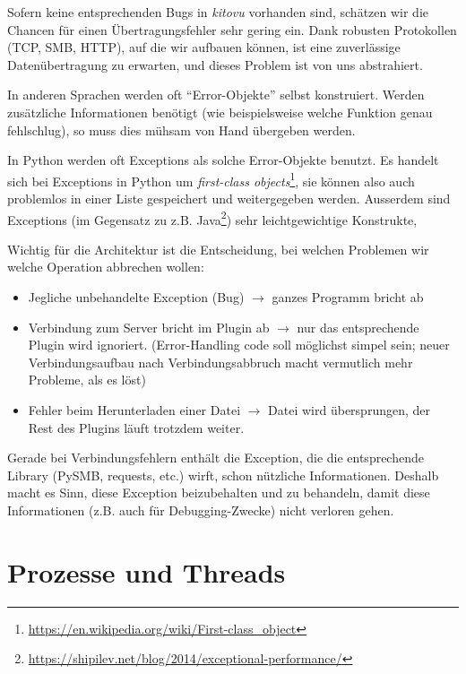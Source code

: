 \documentclass[a4paper]{article}
\let\oldsection\section
\renewcommand\section{\clearpage\oldsection}
\begin{document}
Sofern keine entsprechenden Bugs in \emph{kitovu} vorhanden sind, schätzen wir die
Chancen für einen Übertragungsfehler sehr gering ein. Dank robusten Protokollen
(TCP, SMB, HTTP), auf die wir aufbauen können, ist eine zuverlässige
Datenübertragung zu erwarten, und dieses Problem ist von uns abstrahiert.

In anderen Sprachen werden oft ``Error-Objekte'' selbst konstruiert. Werden
zusätzliche Informationen benötigt (wie beispielsweise welche Funktion genau
fehlschlug), so muss dies mühsam von Hand übergeben werden.

In Python werden oft Exceptions als solche Error-Objekte benutzt. Es handelt
sich bei Exceptions in Python um \emph{first-class
  objects}\footnote{\url{https://en.wikipedia.org/wiki/First-class_object}}, sie
können also auch problemlos in einer Liste gespeichert und weitergegeben werden.
Ausserdem sind Exceptions (im Gegensatz zu z.B.
Java\footnote{\url{https://shipilev.net/blog/2014/exceptional-performance/}})
sehr leichtgewichtige Konstrukte,

Wichtig für die Architektur ist die Entscheidung, bei welchen Problemen wir
welche Operation abbrechen wollen:

\begin{itemize}
  \item Jegliche unbehandelte Exception (Bug) $\rightarrow$ ganzes Programm bricht ab
  \item Verbindung zum Server bricht im Plugin ab $\rightarrow$ nur das
    entsprechende Plugin wird ignoriert. (Error-Handling code soll möglichst
    simpel sein; neuer Verbindungsaufbau nach Verbindungsabbruch macht
    vermutlich mehr Probleme, als es löst)
  \item Fehler beim Herunterladen einer Datei $\rightarrow$ Datei wird
    übersprungen, der Rest des Plugins läuft trotzdem weiter.
\end{itemize}

Gerade bei Verbindungsfehlern enthält die Exception, die die entsprechende
Library (PySMB, requests, etc.) wirft, schon nützliche Informationen. Deshalb
macht es Sinn, diese Exception beizubehalten und zu behandeln, damit diese
Informationen (z.B. auch für Debugging-Zwecke) nicht verloren gehen.

\section{Prozesse und Threads}

\end{document}
